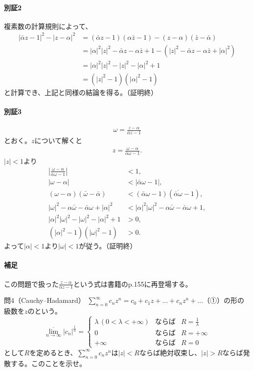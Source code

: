 \paragraph{別証2}
複素数の計算規則によって、
\begin{align*}
    |\bar{\alpha}z-1|^2-|z-\alpha|^2
    &=(\bar{\alpha}z-1)(\alpha\bar{z}-1)-(z-\alpha)(\bar{z}-\bar{\alpha})\\
    &=|\alpha|^2|z|^2-\bar{\alpha}z-\alpha\bar{z}+1-(|z|^2-\bar{\alpha}z-\alpha\bar{z}+|\alpha|^2)\\
    &=|\alpha|^2|z|^2-|z|^2-|\alpha|^2+1\\
    &=(|z|^2-1)(|\alpha|^2-1)
\end{align*}
と計算でき、上記と同様の結論を得る。（証明終）


\paragraph{別証3}
\begin{align*}
    \omega=\frac{z-\alpha}{\bar{\alpha}z-1}
\end{align*}
とおく。$z$について解くと
\begin{align*}
    z=\frac{\omega-\alpha}{\bar{\alpha}\omega-1}.
\end{align*}
$|z|<1$より
\begin{align*}
    \left|\frac{\omega-\alpha}{\bar{\alpha}\omega-1}\right|&<1,\\
    |\omega-\alpha|&<|\bar{\alpha}\omega-1|,\\
    (\omega-\alpha)(\bar{\omega}-\bar{\alpha})
    &<(\bar{\alpha}\omega-1)(\overline{\bar{\alpha}\omega}-1),\\
    |\omega|^2-\alpha\bar{\omega}-\bar{\alpha}\omega+|\alpha|^2
    &<|\alpha|^2|\omega|^2-\alpha\bar{\omega}-\bar{\alpha}\omega+1,\\
    |\alpha|^2|\omega|^2-|\omega|^2-|\alpha|^2+1&>0,\\
    (|\alpha|^2-1)(|\omega|^2-1)&>0.
\end{align*}
よって$|\alpha|<1$より$|\omega|<1$が従う。（証明終）

\paragraph{補足}
この問題で扱った$\frac{z-\alpha}{\bar{\alpha}z-1}$という式は書籍のp.155に再登場する。


\begin{mysimplebox}{問4（Cauchy--Hadamard）}
    $\sum_{n=0}^\infty c_nz^n=c_0+c_1z+\dots+c_nz^n+\dots$（①）の形の級数を$z$のという。
    \[\overline{\lim_{n\to\infty}}|c_n|^{\frac{1}{n}}=\left\{\begin{array}{lll}
      \lambda  \,(0<\lambda<+\infty) & \mbox{ならば} & R=\frac{1}{\lambda}\\
      0 & \mbox{ならば} & R=+\infty\\
      +\infty & \mbox{ならば} & R=0
    \end{array}\right.\]
    として$R$を定めるとき、$\sum_{n=0}^\infty c_nz^n$は$|z|<R$ならば絶対収束し、$|z|>R$ならば発散する。このことを示せ。
\end{mysimplebox}
